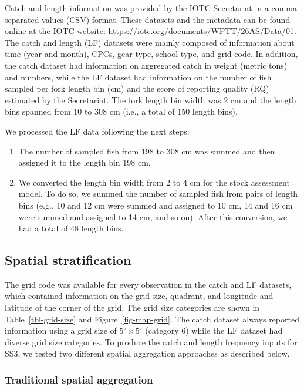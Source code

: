 \documentclass[
]{scrartcl}
\providecommand{\tightlist}{%
  \setlength{\itemsep}{0pt}\setlength{\parskip}{0pt}}\usepackage{longtable,booktabs,array}
\begin{document}
Catch and length information was provided by the IOTC Secretariat in a
comma-separated values (CSV) format. These datasets and the metadata can
be found online at the IOTC website:
\url{https://iotc.org/documents/WPTT/26AS/Data/01}. The catch and length
(LF) datasets were mainly composed of information about time (year and
month), CPCs, gear type, school type, and grid code. In addition, the
catch dataset had information on aggregated catch in weight (metric
tons) and numbers, while the LF dataset had information on the number of
fish sampled per fork length bin (cm) and the score of reporting quality
(RQ) estimated by the Secretariat. The fork length bin width was 2 cm
and the length bins spanned from 10 to 308 cm (i.e., a total of 150
length bins).

We processed the LF data following the next steps:

\begin{enumerate}
\def\labelenumi{\arabic{enumi}.}
\tightlist
\item
  The number of sampled fish from 198 to 308 cm was summed and then
  assigned it to the length bin 198 cm.
\item
  We converted the length bin width from 2 to 4 cm for the stock
  assessment model. To do so, we summed the number of sampled fish from
  pairs of length bins (e.g., 10 and 12 cm were summed and assigned to
  10 cm, 14 and 16 cm were summed and assigned to 14 cm, and so on).
  After this conversion, we had a total of 48 length bins.
\end{enumerate}

\subsection{Spatial stratification}\label{spatial-stratification}

The grid code was available for every observation in the catch and LF
datasets, which contained information on the grid size, quadrant, and
longitude and latitude of the corner of the grid. The grid size
categories are shown in Table~\ref{tbl-grid-size} and
Figure~\ref{fig-map-grid}. The catch dataset always reported information
using a grid size of \(5^\circ\times 5^\circ\) (category 6) while the LF
dataset had diverse grid size categories. To produce the catch and
length frequency inputs for SS3, we tested two different spatial
aggregation approaches as described below.

\subsubsection{Traditional spatial
aggregation}\label{traditional-spatial-aggregation}
\end{document}
